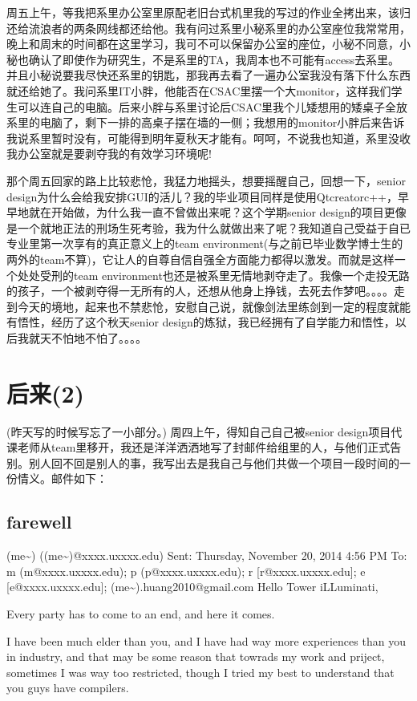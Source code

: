 \documentclass[12pt]{book}
\begin{document}
周五上午，等我把系里办公室里原配老旧台式机里我的写过的作业全拷出来，该归还给流浪者的两条网线都还给他。我有问过系里小秘系里的办公室座位我常常用，晚上和周末的时间都在这里学习，我可不可以保留办公室的座位，小秘不同意，小秘也确认了即使作为研究生，不是系里的TA，我周本也不可能有access去系里。并且小秘说要我尽快还系里的钥匙，那我再去看了一遍办公室我没有落下什么东西就还给她了。我问系里IT小胖，他能否在CSAC里摆一个大monitor，这样我们学生可以连自己的电脑。后来小胖与系里讨论后CSAC里我个儿矮想用的矮桌子全放系里的电脑了，剩下一排的高桌子摆在墙的一侧；我想用的monitor小胖后来告诉我说系里暂时没有，可能得到明年夏秋天才能有。呵呵，不说我也知道，系里没收我办公室就是要剥夺我的有效学习环境呢! 

那个周五回家的路上比较悲怆，我猛力地摇头，想要摇醒自己，回想一下，senior design为什么会给我安排GUI的活儿？我的毕业项目同样是使用Qtcreatorc++，早早地就在开始做，为什么我一直不曾做出来呢？这个学期senior design的项目更像是一个就地正法的刑场生死考验，我为什么就做出来了呢？我知道自己受益于自已专业里第一次享有的真正意义上的team environment(与之前已毕业数学博士生的两外的team不算)，它让人的自尊自信自强全方面能力都得以激发。而就是这样一个处处受刑的team environment也还是被系里无情地剥夺走了。我像一个走投无路的孩子，一个被剥夺得一无所有的人，还想从他身上挣钱，去死去作梦吧。。。。走到今天的境地，起来也不禁悲怆，安慰自己说，就像剑法里练剑到一定的程度就能有悟性，经历了这个秋天senior design的炼狱，我已经拥有了自学能力和悟性，以后我就天不怕地不怕了。。。。
\section{后来(2)}
\label{sec-34-2}
(昨天写的时候写忘了一小部分。) 周四上午，得知自己自己被senior design项目代课老师从team里移开，我还是洋洋洒洒地写了封邮件给组里的人，与他们正式告别。别人回不回是别人的事，我写出去是我自己与他们共做一个项目一段时间的一份情义。邮件如下：
\subsection{farewell}
\label{sec-34-2-1}
(me\textasciitilde{}) ((me\textasciitilde{})@xxxx.uxxxx.edu)
Sent:        Thursday, November 20, 2014 4:56 PM
To:        
m (m@xxxx.uxxxx.edu); p (p@xxxx.uxxxx.edu); r [r@xxxx.uxxxx.edu]; e [e@xxxx.uxxxx.edu]; (me\textasciitilde{}).huang2010@gmail.com
Hello Tower iLLuminati, 

Every party has to come to an end, and here it comes. 

I have been much elder than you, and I have had way more experiences than you in industry, and that may be some reason that towrads my work and priject, sometimes I was way too restricted, though I tried my best to understand that you guys have compilers. 
\end{document}
